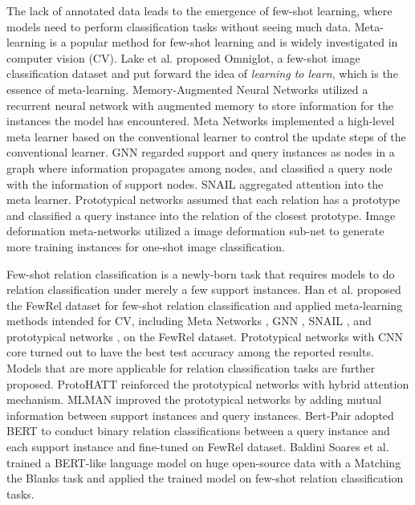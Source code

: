 The lack of annotated data leads to the emergence of few-shot learning,
where models need to perform classification tasks without seeing much data.
Meta-learning is a popular method for few-shot learning and is widely investigated in computer vision (CV).
Lake et al.  proposed Omniglot, a few-shot image classification dataset and put forward the idea of \emph{learning to learn}, which is the essence of meta-learning.
Memory-Augmented Neural Networks \cite{Santoro2016} utilized a recurrent neural network with augmented memory to store information for the instances the model has encountered.
Meta Networks \cite{metanet} implemented a high-level meta learner based on the conventional learner to control the update steps of the conventional learner.
GNN \cite{gnn} regarded support and query instances as nodes in a graph where information propagates among nodes, and classified a query node with the information of support nodes.
SNAIL \cite{snail} aggregated attention into the meta learner.
Prototypical networks \cite{proto} assumed that each relation has a prototype and classified a query instance into the relation of the closest prototype.
Image deformation meta-networks \cite{chen-2019-image} utilized a image deformation sub-net to generate more training instances for one-shot image classification.

Few-shot relation classification is a newly-born task that requires models to do relation classification under merely a few support instances.
Han et al.  proposed the FewRel dataset for few-shot relation classification and applied meta-learning methods intended for CV, including Meta Networks \cite{metanet}, GNN \cite{gnn}, SNAIL \cite{snail}, and prototypical networks \cite{proto}, %
on the FewRel dataset.
Prototypical networks with CNN core turned out to have the best test accuracy among the reported results.
Models that are more applicable for relation classification tasks are further proposed.
ProtoHATT \cite{hatt} reinforced the prototypical networks with hybrid attention mechanism. MLMAN \cite{ye-ling-2019-multi} improved the prototypical networks by adding mutual information between support instances and query instances. Bert-Pair \cite{gao-etal-2019-fewrel} adopted BERT \cite{devlin2018bert} to conduct binary relation classifications between a query instance and each support instance and fine-tuned on FewRel dataset. Baldini Soares et al.  trained a BERT-like language model on huge open-source data with a Matching the Blanks task and applied the trained model on few-shot relation classification tasks.

